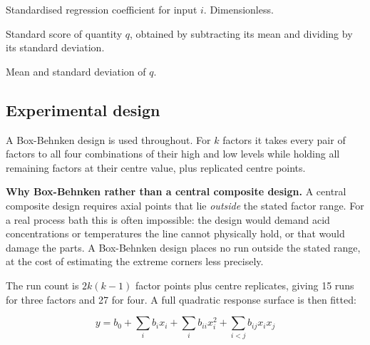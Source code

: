 \documentclass[11pt,a4paper]{article}
\newenvironment{symlist}
  {\vspace{-0.2em}\begin{list}{}{%
    \setlength{\leftmargin}{2.4em}\setlength{\labelwidth}{2.0em}%
    \setlength{\labelsep}{0.4em}\setlength{\itemsep}{1pt}%
    \setlength{\parsep}{0pt}\setlength{\topsep}{3pt}%
    \renewcommand{\makelabel}[1]{##1\hfil}}}
  {\end{list}}
\begin{document}
\begin{symlist}
\item[$\beta_i$] Standardised regression coefficient for input $i$.
Dimensionless.
\item[$z_q$] Standard score of quantity $q$, obtained by subtracting its mean
and dividing by its standard deviation.
\item[$\bar{q}, \sigma_q$] Mean and standard deviation of $q$.
\end{symlist}

\subsection{Experimental design}

A Box-Behnken design is used throughout. For $k$ factors it takes every pair of
factors to all four combinations of their high and low levels while holding all
remaining factors at their centre value, plus replicated centre points.

\begin{keypoint}
\textbf{Why Box-Behnken rather than a central composite design.} A central
composite design requires axial points that lie \emph{outside} the stated
factor range. For a real process bath this is often impossible: the design
would demand acid concentrations or temperatures the line cannot physically
hold, or that would damage the parts. A Box-Behnken design places no run
outside the stated range, at the cost of estimating the extreme corners less
precisely.
\end{keypoint}

The run count is $2k(k-1)$ factor points plus centre replicates, giving 15 runs
for three factors and 27 for four. A full quadratic response surface is then
fitted:

\begin{equation}
y = b_0 + \sum_i b_i x_i + \sum_i b_{ii} x_i^2 + \sum_{i<j} b_{ij} x_i x_j
\label{eq:rsm}
\end{equation}
\end{document}
